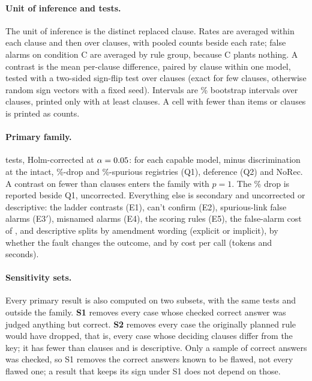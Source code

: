 \paragraph{Unit of inference and tests.}
The unit of inference is the distinct replaced clause. Rates are averaged within each clause and then over clauses, with
pooled counts beside each rate; false alarms on condition C are averaged by rule group, because C plants nothing. A
contrast is the mean per-clause difference, paired by clause within one model, tested with a two-sided sign-flip test over
clauses (exact for few clauses, otherwise \NPermutations{} random sign vectors with a fixed seed). Intervals are
\CILevel\% bootstrap intervals over clauses, printed only with at least \MinClauses{} clauses. A cell with fewer than
\SparseItems{} items or \SparseClauses{} clauses is printed as counts.

\paragraph{Primary family.}
\NPrimaryTestsVFive{} tests, Holm-corrected at $\alpha=0.05$: for each capable model,  minus 
discrimination at the intact, \DamageDropFifty\%-drop and \DamageSpuriousTen\%-spurious registries (Q1), deference (Q2) and
NoRec. A contrast on fewer than \MinClauses{} clauses enters the family with $p=1$. The \DamageDropTwentyFive\% drop is
reported beside Q1, uncorrected. Everything else is secondary and uncorrected or descriptive: the ladder contrasts (E1),
can't confirm (E2), spurious-link false alarms (E3$'$), misnamed alarms (E4), the scoring rules (E5), the false-alarm cost
of , and descriptive splits by amendment wording (explicit or implicit), by whether the fault changes the
outcome, and by cost per call (tokens and seconds).

\paragraph{Sensitivity sets.}
Every primary result is also computed on two subsets, with the same tests and outside the family. \textbf{S1} removes
every case whose checked correct answer was judged anything but correct. \textbf{S2} removes every case the originally
planned rule would have dropped, that is, every case whose deciding clauses differ from the key; it has fewer than
\MinClauses{} clauses and is descriptive. Only a sample of correct answers was checked, so S1 removes the correct
answers known to be flawed, not every flawed one; a result that keeps its sign under S1 does not depend on those.

